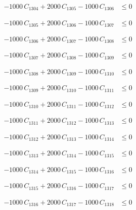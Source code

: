\documentclass[a4paper,11pt]{article}
\begin{document}
\begin{align}
-1000\,C_{1304} + 2000\,C_{1305} - 1000\,C_{1306} &\leq 0 \nonumber
\end{align}

\begin{align}
-1000\,C_{1305} + 2000\,C_{1306} - 1000\,C_{1307} &\leq 0 \nonumber
\end{align}

\begin{align}
-1000\,C_{1306} + 2000\,C_{1307} - 1000\,C_{1308} &\leq 0 \nonumber
\end{align}

\begin{align}
-1000\,C_{1307} + 2000\,C_{1308} - 1000\,C_{1309} &\leq 0 \nonumber
\end{align}

\begin{align}
-1000\,C_{1308} + 2000\,C_{1309} - 1000\,C_{1310} &\leq 0 \nonumber
\end{align}

\begin{align}
-1000\,C_{1309} + 2000\,C_{1310} - 1000\,C_{1311} &\leq 0 \nonumber
\end{align}

\begin{align}
-1000\,C_{1310} + 2000\,C_{1311} - 1000\,C_{1312} &\leq 0 \nonumber
\end{align}

\begin{align}
-1000\,C_{1311} + 2000\,C_{1312} - 1000\,C_{1313} &\leq 0 \nonumber
\end{align}

\begin{align}
-1000\,C_{1312} + 2000\,C_{1313} - 1000\,C_{1314} &\leq 0 \nonumber
\end{align}

\begin{align}
-1000\,C_{1313} + 2000\,C_{1314} - 1000\,C_{1315} &\leq 0 \nonumber
\end{align}

\begin{align}
-1000\,C_{1314} + 2000\,C_{1315} - 1000\,C_{1316} &\leq 0 \nonumber
\end{align}

\begin{align}
-1000\,C_{1315} + 2000\,C_{1316} - 1000\,C_{1317} &\leq 0 \nonumber
\end{align}

\begin{align}
-1000\,C_{1316} + 2000\,C_{1317} - 1000\,C_{1318} &\leq 0 \nonumber
\end{align}
\end{document}
